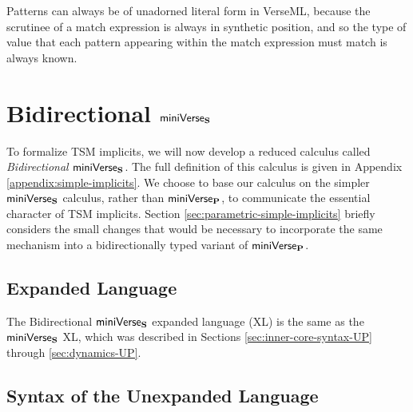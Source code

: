 Patterns can always be of unadorned literal form in VerseML, because the scrutinee of a match expression is always in synthetic position, and so the type of value that each pattern appearing within the match expression must match is always known. 

\section{\texorpdfstring{Bidirectional $\mathsf{miniVerse}_\textbf{S}$}{Bidirectional miniVerseS}}\label{sec:b-miniverse}
To formalize TSM implicits, we will now develop a reduced calculus called \emph{Bidirectional $\mathsf{miniVerse}_\textbf{S}$}. The full definition of this calculus is given in Appendix \ref{appendix:simple-implicits}. We choose to base our calculus on the simpler $\mathsf{miniVerse}_\textbf{S}$ calculus, rather than $\mathsf{miniVerse}_\textbf{P}$, to communicate the essential character of TSM implicits. Section \ref{sec:parametric-simple-implicits} briefly considers the small changes that would be necessary to incorporate the same mechanism into a bidirectionally typed variant of $\mathsf{miniVerse}_\textbf{P}$.

\subsection{Expanded Language}
The Bidirectional $\mathsf{miniVerse}_\textbf{S}$ expanded language (XL) is the same as the  $\mathsf{miniVerse}_\textbf{S}$ XL, which was described in Sections \ref{sec:inner-core-syntax-UP} through \ref{sec:dynamics-UP}. %

\subsection{Syntax of the Unexpanded Language}

